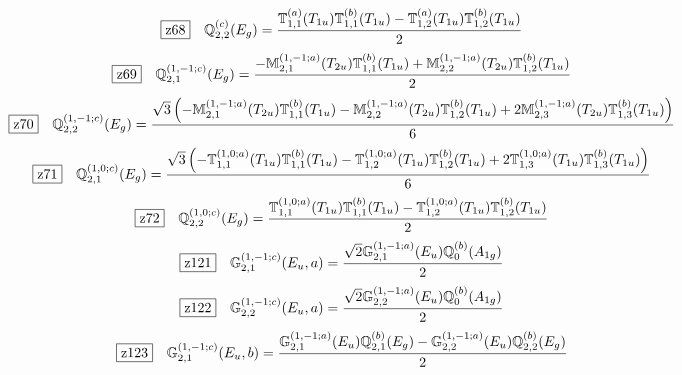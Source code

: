 \documentclass[fleqn,10pt,landscape]{jsarticle}
\begin{document}
\begin{dmath*}
\hspace*{3mm}\fbox{z68}\quad \mathbb{Q}_{2,2}^{(c)}(E_{g})=\frac{\mathbb{T}_{1,1}^{(a)}(T_{1u}) \mathbb{T}_{1,1}^{(b)}(T_{1u}) - \mathbb{T}_{1,2}^{(a)}(T_{1u}) \mathbb{T}_{1,2}^{(b)}(T_{1u})}{2}
\end{dmath*}
\begin{dmath*}
\hspace*{3mm}\fbox{z69}\quad \mathbb{Q}_{2,1}^{(1,-1;c)}(E_{g})=\frac{- \mathbb{M}_{2,1}^{(1,-1;a)}(T_{2u}) \mathbb{T}_{1,1}^{(b)}(T_{1u}) + \mathbb{M}_{2,2}^{(1,-1;a)}(T_{2u}) \mathbb{T}_{1,2}^{(b)}(T_{1u})}{2}
\end{dmath*}
\begin{dmath*}
\hspace*{3mm}\fbox{z70}\quad \mathbb{Q}_{2,2}^{(1,-1;c)}(E_{g})=\frac{\sqrt{3} \left(- \mathbb{M}_{2,1}^{(1,-1;a)}(T_{2u}) \mathbb{T}_{1,1}^{(b)}(T_{1u}) - \mathbb{M}_{2,2}^{(1,-1;a)}(T_{2u}) \mathbb{T}_{1,2}^{(b)}(T_{1u}) + 2 \mathbb{M}_{2,3}^{(1,-1;a)}(T_{2u}) \mathbb{T}_{1,3}^{(b)}(T_{1u})\right)}{6}
\end{dmath*}
\begin{dmath*}
\hspace*{3mm}\fbox{z71}\quad \mathbb{Q}_{2,1}^{(1,0;c)}(E_{g})=\frac{\sqrt{3} \left(- \mathbb{T}_{1,1}^{(1,0;a)}(T_{1u}) \mathbb{T}_{1,1}^{(b)}(T_{1u}) - \mathbb{T}_{1,2}^{(1,0;a)}(T_{1u}) \mathbb{T}_{1,2}^{(b)}(T_{1u}) + 2 \mathbb{T}_{1,3}^{(1,0;a)}(T_{1u}) \mathbb{T}_{1,3}^{(b)}(T_{1u})\right)}{6}
\end{dmath*}
\begin{dmath*}
\hspace*{3mm}\fbox{z72}\quad \mathbb{Q}_{2,2}^{(1,0;c)}(E_{g})=\frac{\mathbb{T}_{1,1}^{(1,0;a)}(T_{1u}) \mathbb{T}_{1,1}^{(b)}(T_{1u}) - \mathbb{T}_{1,2}^{(1,0;a)}(T_{1u}) \mathbb{T}_{1,2}^{(b)}(T_{1u})}{2}
\end{dmath*}
\begin{dmath*}
\hspace*{3mm}\fbox{z121}\quad \mathbb{G}_{2,1}^{(1,-1;c)}(E_{u},a)=\frac{\sqrt{2} \mathbb{G}_{2,1}^{(1,-1;a)}(E_{u}) \mathbb{Q}_{0}^{(b)}(A_{1g})}{2}
\end{dmath*}
\begin{dmath*}
\hspace*{3mm}\fbox{z122}\quad \mathbb{G}_{2,2}^{(1,-1;c)}(E_{u},a)=\frac{\sqrt{2} \mathbb{G}_{2,2}^{(1,-1;a)}(E_{u}) \mathbb{Q}_{0}^{(b)}(A_{1g})}{2}
\end{dmath*}
\begin{dmath*}
\hspace*{3mm}\fbox{z123}\quad \mathbb{G}_{2,1}^{(1,-1;c)}(E_{u},b)=\frac{\mathbb{G}_{2,1}^{(1,-1;a)}(E_{u}) \mathbb{Q}_{2,1}^{(b)}(E_{g}) - \mathbb{G}_{2,2}^{(1,-1;a)}(E_{u}) \mathbb{Q}_{2,2}^{(b)}(E_{g})}{2}
\end{dmath*}
\end{document}
